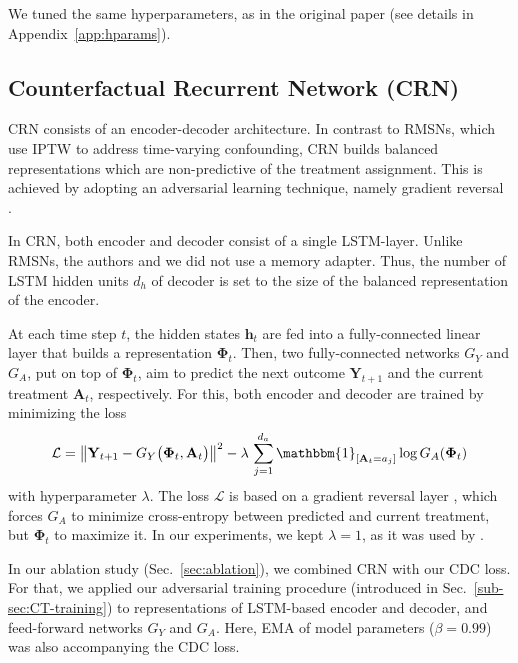 \documentclass{article}
\theoremstyle{plain}
\theoremstyle{definition}
\theoremstyle{remark}
\begin{document}
We tuned the same hyperparameters, as in the original paper \cite{lim2018forecasting} (see details in Appendix~\ref{app:hparams}).

\subsection{Counterfactual Recurrent Network (CRN)}

CRN consists of an encoder-decoder architecture. In contrast to RMSNs, which use IPTW to address time-varying confounding, CRN builds balanced representations which are non-predictive of the treatment assignment. This is achieved by adopting an adversarial learning technique, namely gradient reversal \cite{ganin2015unsupervised}.

In CRN, both encoder and decoder consist of a single LSTM-layer. Unlike RMSNs, the authors and we did not use a memory adapter. Thus, the number of LSTM hidden units $d_h$ of decoder is set to the size of the balanced representation of the encoder.

At each time step $t$, the hidden states $\mathbf{h}_t$ are fed into a fully-connected linear layer that builds a representation $\mathbf{\Phi}_t$. Then, two fully-connected networks $G_Y$ and $G_A$, put on top of $\mathbf{\Phi}_t$, aim to predict the next outcome $\mathbf{Y}_{t+1}$ and the current treatment $\mathbf{A}_t$, respectively. For this, both encoder and decoder are trained by minimizing the loss
\begin{equation}
    \mathcal{L} = \left\Vert \mathbf{Y}_{t+1} - G_Y\big(\mathbf{\Phi}_t, \mathbf{A}_t \big) \right\Vert^2 - \lambda \, \sum_{j=1}^{d_a} \mathbbm{1}_{[\mathbf{A}_t = a_j]} \log G_A (\mathbf{\Phi}_t)
\end{equation}
with hyperparameter $\lambda$. The loss $\mathcal{L}$ is based on a gradient reversal layer \cite{ganin2015unsupervised}, which forces $G_A$ to minimize cross-entropy between predicted and current treatment, but $\mathbf{\Phi}_t$ to maximize it. In our experiments, we kept $\lambda = 1$, as it was used by \cite{atan2018learning,bica2020estimating}.

In our ablation study (Sec.~\ref{sec:ablation}), we combined CRN with our CDC loss. For that, we applied our adversarial training procedure (introduced in Sec.~\ref{sub-sec:CT-training}) to representations of LSTM-based encoder and decoder, and feed-forward networks $G_Y$ and $G_A$. Here, EMA of model parameters ($\beta = 0.99$) was also accompanying the CDC loss.
\end{document}

